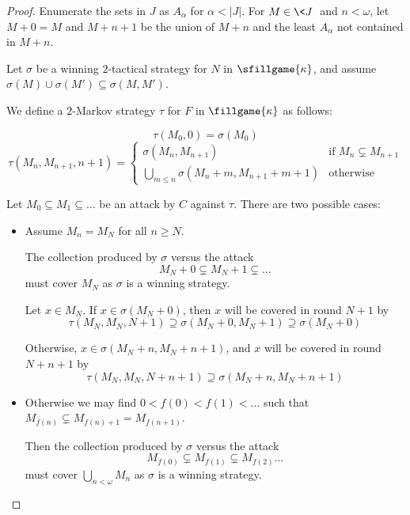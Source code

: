   \begin{proof}
    Enumerate the sets in $J$ as $A_\alpha$ for $\alpha<|J|$. For $M\in \<J\>$ and $n<\omega$, let $M+0=M$ and $M+n+1$ be the union of $M+n$ and the least $A_\alpha$ not contained in $M+n$.

    Let $\sigma$ be a winning $2$-tactical strategy for $N$ in $\sfillgame{\kappa}$, and assume $\sigma(M)\cup\sigma(M')\subseteq\sigma(M,M')$.

    We define a $2$-Markov strategy $\tau$ for $F$ in $\fillgame{\kappa}$ as follows:

      \[
        \tau(M_0,0) = \sigma(M_0)
      \]
      \[
        \tau(M_{n},M_{n+1},n+1) = \left\{
          \begin{array}{ll}
            \sigma(M_{n},M_{n+1}) & \text{if } M_n\subsetneq M_{n+1} \\
            \bigcup_{m\leq n}\sigma(M_n+m,M_{n+1}+m+1) & \text{otherwise}
          \end{array}
        \right.
      \]

    Let $M_0 \subseteq M_1 \subseteq \dots$ be an attack by $C$ against $\tau$. There are two possible cases:

      \begin{itemize}
        \item
          Assume $M_n=M_N$ for all $n\geq N$.

          The collection produced by $\sigma$ versus the attack
            \[
              M_N+0 \subsetneq M_N+1 \subsetneq \dots
            \] 
          must cover $M_N$ as $\sigma$ is a winning strategy.

          Let $x \in M_N$. If $x\in\sigma(M_N+0)$, then $x$ will be covered in round $N+1$ by 
            \[
              \tau(M_N,M_N,N+1)
              \supseteq \sigma(M_N+0,M_N+1)
              \supseteq \sigma(M_N+0)
            \]

          Otherwise, $x\in\sigma(M_N+n,M_N+n+1)$, and $x$ will be covered in round $N+n+1$ by 
            \[
              \tau(M_N,M_N,N+n+1)
              \supseteq \sigma(M_N+n,M_N+n+1)
            \]

        \item
          Otherwise we may find $0<f(0)<f(1)<\dots$ such that $M_{f(n)}\subsetneq M_{f(n)+1}=M_{f(n+1)}$.

          Then the collection produced by $\sigma$ versus the attack 
            \[
              M_{f(0)}\subsetneq M_{f(1)} \subsetneq M_{f(2)} \dots
            \]
          must cover $\bigcup_{n<\omega}M_n$ as $\sigma$ is a winning strategy.


\end{itemize}
\end{proof}
